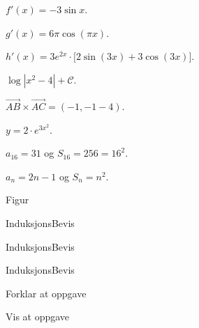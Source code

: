 \begin{Kortesvar}

  \begin{losning}


  \item   $ f'(x) = -3 \sin x$.

  \item   $ g'(x) = 6 \pi \cos(\pi x) $.

  \item   $ h'(x) = 3 e^{2x} \cdot \bigl[ 2 \sin(3x) + 3 \cos(3x) \bigr]  $.

    \Kortsvar	%

  \item   $ \log \left| x^2 - 4 \right| + \mathcal{C} $.

    \Kortsvar	%

  \item   $ \vec{AB} \times \vec{AC} = (-1,-1-4) $.

    \Kortsvar	%

  \item   $ y = 2 \cdot e^{3x^2} $.

    \kortsvar	%

  \item   $ a_{16} = 31 $ og $ S_{16} = 256 = 16^2 $.

  \item   $ a_n = 2n - 1 $ og $ S_n = n^2 $.

    \Kortsvar	%

  \item   Figur

    \kortsvar	%

  \item  InduksjonsBevis

    \Kortsvar	%

  \item  InduksjonsBevis

    \kortsvar	%

  \item  InduksjonsBevis


    \kortsvar	%

  \item   Forklar at oppgave

  \item   Vis at oppgave


\end{losning}
\end{Kortesvar}

